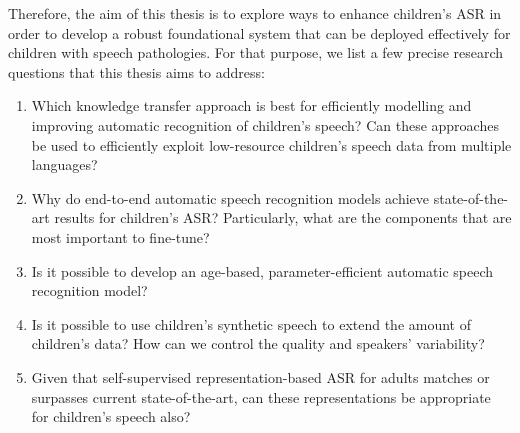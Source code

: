 
Therefore, the aim of this thesis is to explore ways to enhance children's ASR in order to develop a robust foundational system that can be deployed effectively for children with speech pathologies.
For that purpose, we list a few precise research questions that this thesis aims to address:
\begin{enumerate}
\item Which knowledge transfer approach is best for efficiently modelling and improving automatic recognition of children's speech? Can these approaches be used to efficiently exploit low-resource children's speech data from multiple languages?
\item  Why do end-to-end automatic speech recognition models achieve state-of-the-art results for children's ASR? Particularly, what are the components that are most important to fine-tune?
\item Is it possible to develop an age-based, parameter-efficient automatic speech recognition model?
\item Is it possible to use children's synthetic speech to extend the amount of children's data? How can we control the quality and speakers’ variability?
\item Given that self-supervised representation-based ASR for adults matches or surpasses current state-of-the-art, can these representations be appropriate for children’s speech also?
\end{enumerate}

